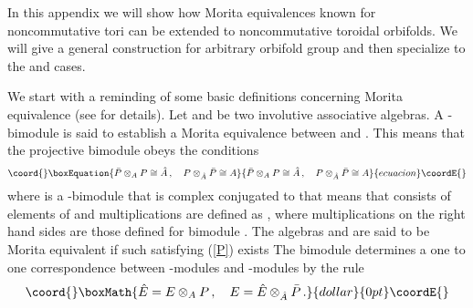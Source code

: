 \documentclass[a4paper,a4paper]{article}
\begin{document}
{In this appendix we will show how Morita equivalences known for noncommutative tori can be extended to noncommutative 
toroidal orbifolds. We will give a general construction for arbitrary orbifold group \coordHE{} and then specialize to the 
\coordHE{} and \coordHE{} cases. 


We start with a  reminding of some basic definitions concerning Morita equivalence (see \cite{ASMorita} for details).
Let \coordHE{} and \coordHE{} be two involutive associative algebras. 
A \coordHE{}-bimodule \coordHE{} is said to  establish a   Morita equivalence between \coordHE{} and 
\coordHE{}. This means that the projective bimodule \coordHE{} obeys the conditions 
\begin{equation}\coord{}\boxEquation{ \label{P}
\bar P\otimes_{A}P\cong \hat A \, , \quad P\otimes_{\hat A}\bar P \cong A 
}{ \bar P\otimes_{A}P\cong \hat A \, , \quad P\otimes_{\hat A}\bar P \cong A 
}{ecuacion}\coordE{}\end{equation}
where \coordHE{} is a \coordHE{}-bimodule  that is  complex conjugated to \coordHE{} that means that 
\coordHE{} consists of elements of \coordHE{} and multiplications are defined as \coordHE{}, 
\coordHE{} where multiplications on the right hand sides are those defined for bimodule \coordHE{}.   
The algebras \coordHE{} and \coordHE{} are said to be Morita equivalent if such \coordHE{} satisfying  (\ref{P}) exists
The bimodule \coordHE{} determines a one to one correspondence between \coordHE{}-modules and 
\coordHE{}-modules by the rule 
$$\coord{}\boxMath{
\hat E=E\otimes_{A}P \, , \quad E=\hat E\otimes_{\hat A}\bar P \, .
}{dollar}{0pt}\coordE{}$$ 

}
\end{document}
